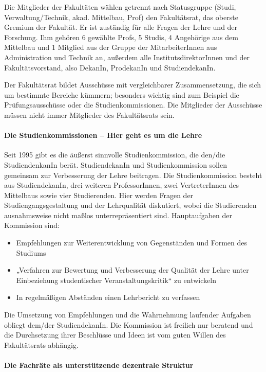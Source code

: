 Die Mitglieder der Fakultäten wählen getrennt nach Statusgruppe (Studi, Verwaltung/Technik, akad. Mittelbau, Prof) den Fakultätsrat, das oberste Gremium der Fakultät. Er ist zuständig für alle Fragen der Lehre und der Forschung. Ihm gehören 6 gewählte Profs, 5 Studis, 4 Angehörige aus dem Mittelbau und 1 Mitglied aus der Gruppe der MitarbeiterInnen aus Administration und Technik an, außerdem alle InstitutsdirektorInnen und der Fakultätsvorstand, also DekanIn, ProdekanIn und StudiendekanIn.

Der Fakultätsrat bildet Ausschüsse mit vergleichbarer Zusammensetzung, die sich um bestimmte Bereiche kümmern; besonders wichtig
sind zum Beispiel die Prüfungsausschüsse oder die Studienkommissionen. Die Mitglieder der Ausschüsse müssen nicht immer Mitglieder des Fakultätsrats
sein.


\paragraph{Die Studienkommissionen -- Hier geht es um die Lehre}

Seit 1995 gibt es die äußerst sinnvolle Studienkommission, die den/die StudiendenkanIn berät. StudiendekanIn und Studienkommission sollen gemeinsam zur Verbesserung der Lehre beitragen. Die Studienkommission besteht aus StudiendekanIn, drei weiteren ProfessorInnen, zwei VertreterInnen des Mittelbaus sowie vier Studierenden. Hier werden Fragen der Studiengangsgestaltung und der Lehrqualität diskutiert, wobei die Studierenden ausnahmsweise nicht maßlos unterrepräsentiert sind. Hauptaufgaben der Kommission sind:
\begin{itemize}
    \addtolength{\itemsep}{-0.7\baselineskip}
    \item Empfehlungen zur Weiterentwicklung von Gegenständen und Formen des Studiums
    \item „Verfahren zur Bewertung und Verbesserung der Qualität der Lehre unter
          Einbeziehung studentischer Veranstaltungskritik“ zu entwickeln
    \item In regelmäßigen Abständen einen Lehrbericht zu verfassen
\end{itemize}

Die Umsetzung von Empfehlungen und die Wahrnehmung laufender Aufgaben obliegt dem/der StudiendekanIn. Die Kommission ist freilich nur
beratend und die Durchsetzung ihrer Beschlüsse und Ideen ist vom guten Willen des Fakultätsrats abhängig.

\paragraph{Die Fachräte als unterstützende dezentrale Struktur}

